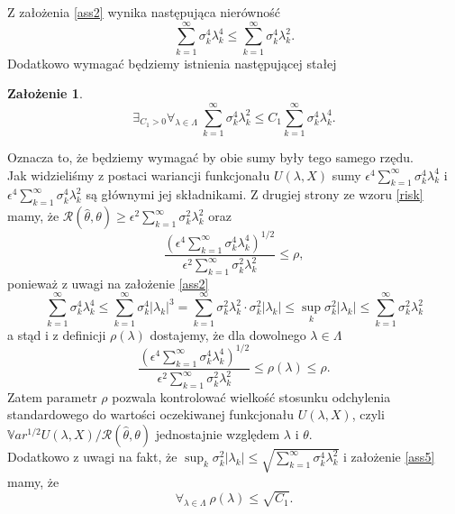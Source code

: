 \documentclass{article}
\newtheorem{za}{Założenie}
\begin{document}
Z założenia \ref{ass2} wynika następująca nierówność
\begin{displaymath}
\sum_{k=1}^{\infty}\sigma_k^4\lambda_k^4\leq\sum_{k=1}^{\infty}\sigma_k^4\lambda_k^2.
\end{displaymath}
Dodatkowo wymagać będziemy istnienia następującej stałej
\begin{za}
\begin{displaymath}\label{ass5}
\exists_{C_1>0}\forall_{\lambda\in \Lambda}\ \sum_{k=1}^{\infty}\sigma_k^4\lambda_k^2\leq C_1\sum_{k=1}^{\infty}\sigma_k^4\lambda_k^4.
\end{displaymath}
\end{za}
Oznacza to, że będziemy wymagać by obie sumy były tego samego rzędu.\\
Jak widzieliśmy z postaci wariancji funkcjonału $U(\lambda, X)$ sumy $\epsilon^4\sum_{k=1}^{\infty}\sigma_k^4\lambda_k^4$ i $\epsilon^4\sum_{k=1}^{\infty}\sigma_k^4\lambda_k^2$ są głównymi jej składnikami. Z drugiej strony ze wzoru \ref{risk} mamy, że $\mathcal{R}(\hat{\theta},\theta)\geq \epsilon^2\sum_{k=1}^{\infty}\sigma_k^2\lambda_k^2$ oraz 
\begin{equation}\label{rho}
\frac{\left(\epsilon^4\sum_{k=1}^{\infty}\sigma_k^4\lambda_k^4\right)^{1/2}}{\epsilon^2\sum_{k=1}^{\infty}\sigma_k^2\lambda_k^2}\leq \rho,
\end{equation}
ponieważ z uwagi na założenie \ref{ass2}
\begin{displaymath}
\sum_{k=1}^{\infty}\sigma_k^4\lambda_k^4\leq \sum_{k=1}^{\infty}\sigma_k^4|\lambda_k|^3=\sum_{k=1}^{\infty}\sigma_k^2\lambda_k^2\cdot \sigma_k^2|\lambda_k|\leq \sup_k\sigma_k^2|\lambda_k|\leq\sum_{k=1}^{\infty}\sigma_k^2\lambda_k^2
\end{displaymath}
a stąd i z definicji $\rho(\lambda)$ dostajemy, że dla dowolnego $\lambda\in \Lambda$
\begin{displaymath}
\frac{\left(\epsilon^4\sum_{k=1}^{\infty}\sigma_k^4\lambda_k^4\right)^{1/2}}{\epsilon^2\sum_{k=1}^{\infty}\sigma_k^2\lambda_k^2}\leq \rho(\lambda)\leq\rho.
\end{displaymath}
Zatem parametr $\rho$ pozwala kontrolować wielkość stosunku odchylenia standardowego do wartości oczekiwanej funkcjonału $U(\lambda,X)$, czyli $\mathbb{V}ar^{1/2}U(\lambda,X)/\mathcal{R}(\hat{\theta},\theta)$ jednostajnie względem $\lambda$ i $\theta$.\\
Dodatkowo z uwagi na fakt, że $\sup_k\sigma_k^2|\lambda_k|\leq \sqrt{\sum_{k=1}^{\infty}\sigma_k^4\lambda_k^2}$ i założenie \ref{ass5} mamy, że
\begin{displaymath}
\forall_{\lambda\in \Lambda}\ \rho(\lambda)\leq \sqrt{C_1}.
\end{displaymath}
\end{document}
